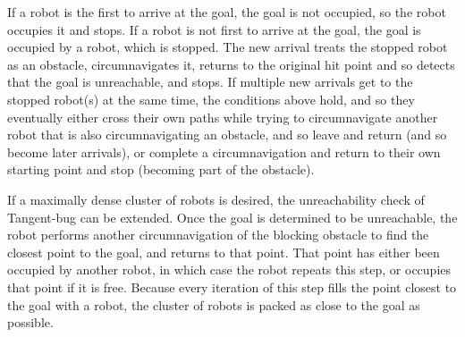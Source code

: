If a robot is the first to arrive at the goal, the goal is not occupied, so the robot occupies it and stops. 
If a robot is not first to arrive at the goal, the goal is occupied by a robot, which is stopped. 
The new arrival treats the stopped robot as an obstacle, circumnavigates it, returns to the original hit point and so detects that the goal is unreachable, and stops. 
If multiple new arrivals get to the stopped robot(s) at the same time, the conditions above hold, and so they eventually either cross their own paths while trying to circumnavigate another robot that is also circumnavigating an obstacle, and so leave and return (and so become later arrivals), or complete a circumnavigation and return to their own starting point and stop (becoming part of the obstacle).

If a maximally dense cluster of robots is desired, the unreachability check of Tangent-bug can be extended. 
Once the goal is determined to be unreachable, the robot performs another circumnavigation of the blocking obstacle to find the closest point to the goal, and returns to that point. 
That point has either been occupied by another robot, in which case the robot repeats this step, or occupies that point if it is free. 
Because every iteration of this step fills the point closest to the goal with a robot, the cluster of robots is packed as close to the goal as possible. 

